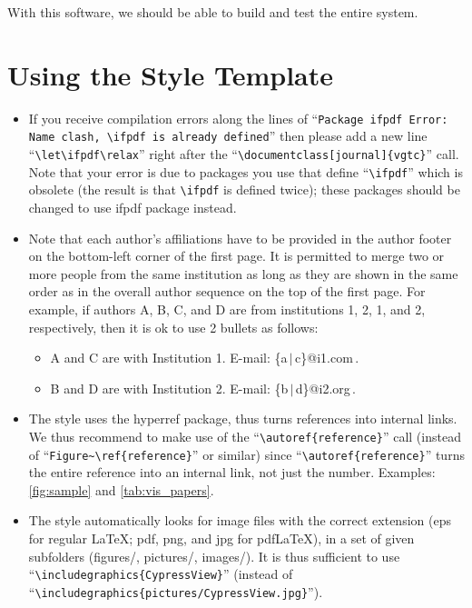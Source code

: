 \documentclass[journal]{vgtc}                %
\begin{document}
With this software, we should be able to build and test the entire system.

\section{Using the Style Template}

\begin{itemize}
\item If you receive compilation errors along the lines of ``\texttt{Package ifpdf Error: Name clash, \textbackslash ifpdf is already defined}'' then please add a new line ``\texttt{\textbackslash let\textbackslash ifpdf\textbackslash relax}'' right after the ``\texttt{\textbackslash documentclass[journal]\{vgtc\}}'' call. Note that your error is due to packages you use that define ``\texttt{\textbackslash ifpdf}'' which is obsolete (the result is that \texttt{\textbackslash ifpdf} is defined twice); these packages should be changed to use ifpdf package instead.
\item Note that each author's affiliations have to be provided in the author footer on the bottom-left corner of the first page. It is permitted to merge two or more people from the same institution as long as they are shown in the same order as in the overall author sequence on the top of the first page. For example, if authors A, B, C, and D are from institutions 1, 2, 1, and 2, respectively, then it is ok to use 2 bullets as follows:
\begin{itemize}
\item A and C are with Institution 1. E-mail: \{a\,$|$\,c\}@i1.com\,.
\item B and D are with Institution 2. E-mail: \{b\,$|$\,d\}@i2.org\,.
\end{itemize}
\item The style uses the hyperref package, thus turns references into internal links. We thus recommend to make use of the ``\texttt{\textbackslash autoref\{reference\}}'' call (instead of ``\texttt{Figure\~{}\textbackslash ref\{reference\}}'' or similar) since ``\texttt{\textbackslash autoref\{reference\}}'' turns the entire reference into an internal link, not just the number. Examples: \autoref{fig:sample} and \autoref{tab:vis_papers}.
\item The style automatically looks for image files with the correct extension (eps for regular \LaTeX; pdf, png, and jpg for pdf\LaTeX), in a set of given subfolders (figures/, pictures/, images/). It is thus sufficient to use ``\texttt{\textbackslash includegraphics\{CypressView\}}'' (instead of ``\texttt{\textbackslash includegraphics\{pictures/CypressView.jpg\}}'').

\end{itemize}
\end{document}
